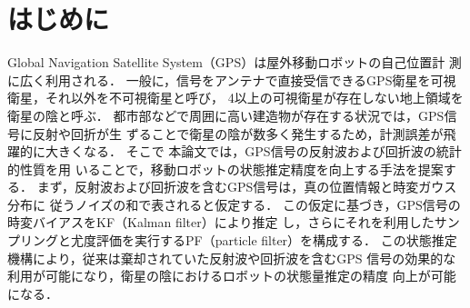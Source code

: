 \documentclass[a4paper,10pt,twocolumn,fleqn]{jsarticle}
\begin{document}
\section{はじめに}
\label{intro}
%
\vspace{-2mm}
Global Navigation Satellite System（GPS）は屋外移動ロボットの自己位置計
測に広く利用される．
%
%
一般に，信号をアンテナで直接受信できるGPS衛星を可視衛星，それ以外を不可視衛星と呼び，
4以上の可視衛星が存在しない地上領域を衛星の陰と呼ぶ．
%
都市部などで周囲に高い建造物が存在する状況では，GPS信号に反射や回折が生
ずることで衛星の陰が数多く発生するため，計測誤差が飛躍的に大きくなる．
%
%
%
%
%
%
%
%
%
%
そこで
本論文では，GPS信号の反射波および回折波の統計的性質を用
いることで，移動ロボットの状態推定精度を向上する手法を提案する．
%
まず，反射波および回折波を含むGPS信号は，真の位置情報と時変ガウス分布に
従うノイズの和で表されると仮定する．
この仮定に基づき，GPS信号の時変バイアスをKF（Kalman filter）により推定
し，さらにそれを利用したサンプリングと尤度評価を実行するPF（particle
filter）を構成する．
この状態推定機構により，従来は棄却されていた反射波や回折波を含むGPS
信号の効果的な利用が可能になり，衛星の陰におけるロボットの状態量推定の精度
向上が可能になる．
%
\end{document}

